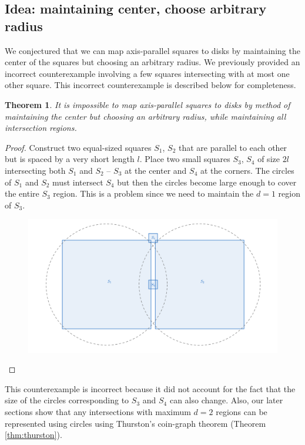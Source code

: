 \documentclass{NSF}
\newtheorem{theorem}{Theorem}[section]
\begin{document}
\subsection{Idea: maintaining center, choose arbitrary radius}
We conjectured that we can map axis-parallel squares to disks by maintaining the center of the squares but choosing an arbitrary radius.
We previously provided an incorrect counterexample involving a few squares intersecting with at most one other square. This incorrect counterexample is described below for completeness.

\begin{theorem}
It is impossible to map axis-parallel squares to disks by method of maintaining the center but choosing an arbitrary radius, while maintaining all intersection regions.
\end{theorem}
\begin{proof}
Construct two equal-sized squares $S_1$, $S_2$ that are parallel to each other but is spaced by a very short length $l$. Place two small squares $S_3$, $S_4$ of size $2l$ intersecting both $S_1$ and $S_2$ -- $S_3$ at the center and $S_4$ at the corners. The circles of $S_1$ and $S_2$ must intersect $S_4$ but then the circles become large enough to cover the entire $S_3$ region. This is a problem since we need to maintain the $d=1$ region of $S_3$.
\begin{figure}
\centering
\includegraphics[width=.3\textwidth]{images/counterexample-same-center}
\caption{}
\end{figure}
\end{proof}

This counterexample is incorrect because it did not account for the fact that the size of the circles corresponding to $S_3$ and $S_4$ can also change. Also, our later sections show that any intersections with maximum $d=2$ regions can be represented using circles using Thurston's coin-graph theorem (Theorem \ref{thm:thurston}). 
\end{document}
